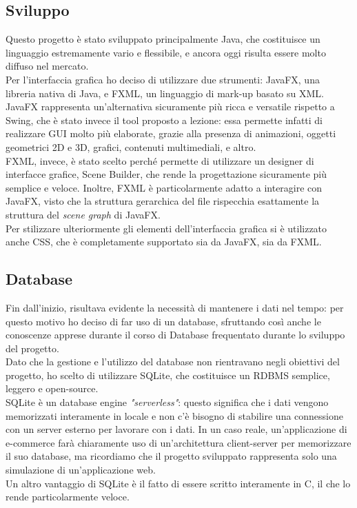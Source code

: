 \documentclass[12pt,a4paper]{article}
\begin{document}
	\subsection{Sviluppo} 
	Questo progetto è stato sviluppato principalmente Java, che costituisce un linguaggio estremamente vario e flessibile, e ancora oggi risulta essere molto diffuso nel mercato.\\Per l'interfaccia grafica ho deciso di utilizzare due strumenti: JavaFX, una libreria nativa di Java, e FXML, un linguaggio di mark-up basato su XML. \\JavaFX rappresenta un'alternativa sicuramente più ricca e versatile rispetto a Swing, che è stato invece il tool proposto a lezione: essa permette infatti di realizzare GUI molto più elaborate, grazie alla presenza di animazioni, oggetti geometrici 2D e 3D, grafici, contenuti multimediali, e altro.\\FXML, invece, è stato scelto perché permette di utilizzare un designer di interfacce grafice, Scene Builder, che rende la progettazione sicuramente più semplice e veloce. Inoltre, FXML è particolarmente adatto a interagire con JavaFX, visto che la struttura gerarchica del file rispecchia esattamente la struttura del \textit{scene graph} di JavaFX.\\
	Per stilizzare ulteriormente gli elementi dell'interfaccia grafica si è utilizzato anche CSS, che è completamente supportato sia da JavaFX, sia da FXML.
	\subsection{Database}
	Fin dall'inizio, risultava evidente la necessità di mantenere i dati nel tempo: per questo motivo ho deciso di far uso di un database, sfruttando così anche le conoscenze apprese durante il corso di Database frequentato durante lo sviluppo del progetto.\\
	Dato che la gestione e l'utilizzo del database non rientravano negli obiettivi del progetto, ho scelto di utilizzare SQLite, che costituisce un RDBMS semplice, leggero e open-source.\\
	SQLite è un database engine \textit{"serverless"}: questo significa che i dati vengono memorizzati interamente in locale e non c'è bisogno di stabilire una connessione con un server esterno per lavorare con i dati. In un caso reale, un'applicazione di e-commerce farà chiaramente uso di un'architettura client-server per memorizzare il suo database, ma ricordiamo che il progetto sviluppato rappresenta solo una simulazione di un'applicazione web. \\
	Un altro vantaggio di SQLite è il fatto di essere scritto interamente in C, il che lo rende particolarmente veloce.
\end{document}
